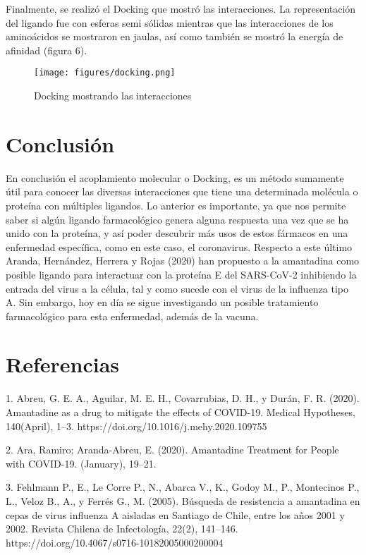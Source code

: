 \documentclass[12pt]{article}
\begin{document}
    Finalmente, se realizó el Docking que mostró las interacciones. La representación del ligando fue con esferas semi sólidas mientras que las interacciones de los aminoácidos se mostraron en jaulas, así como también se mostró la energía de afinidad (figura 6). 
    
    \begin{figure}[!ht]
 \centering
 \texttt{[image: figures/docking.png]}
 \caption{Docking mostrando las interacciones}
 \label{fig:exemplo}
\end{figure}


	
	\section{Conclusión}
	\label{sec:conclusao}
	
	En conclusión el acoplamiento molecular o Docking, es un método sumamente útil para conocer las diversas interacciones que tiene una determinada molécula o proteína con múltiples ligandos. Lo anterior es importante, ya que nos permite saber si algún ligando farmacológico genera alguna respuesta una vez que se ha unido con la proteína, y así poder descubrir más usos de estos fármacos en una enfermedad específica, como en este caso, el coronavirus. Respecto a este último Aranda, Hernández, Herrera y Rojas (2020) han propuesto a la amantadina como posible ligando para interactuar con la proteína E del SARS-CoV-2 inhibiendo la entrada del virus a la célula, tal y como sucede con el virus de la influenza tipo A. Sin embargo, hoy en día se sigue investigando un posible tratamiento farmacológico para esta enfermedad, además de la vacuna.
	
	
	
	
	\section{Referencias}
\label{chap:Referencias}

1.	Abreu, G. E. A., Aguilar, M. E. H., Covarrubias, D. H., y Durán, F. R. (2020). Amantadine as a drug to mitigate the effects of COVID-19. Medical Hypotheses, 140(April), 1–3. https://doi.org/10.1016/j.mehy.2020.109755

2.	Ara, Ramiro; Aranda-Abreu, E. (2020). Amantadine Treatment for People with COVID-19. (January), 19–21.

3.	Fehlmann P., E., Le Corre P., N., Abarca V., K., Godoy M., P., Montecinos P., L., Veloz B., A., y Ferrés G., M. (2005). Búsqueda de resistencia a amantadina en cepas de virus influenza A aisladas en Santiago de Chile, entre los años 2001 y 2002. Revista Chilena de Infectología, 22(2), 141–146. https://doi.org/10.4067/s0716-10182005000200004
\end{document}
